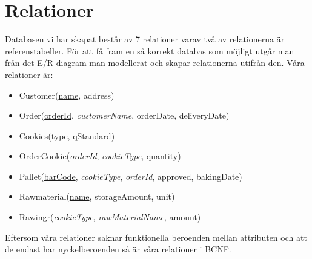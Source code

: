 \section{Relationer}

Databasen vi har skapat består av 7 relationer varav två av relationerna är referenstabeller. För att få fram en så korrekt databas som möjligt utgår man från det E/R diagram man modellerat och skapar relationerna utifrån den. Våra relationer är:

\begin{itemize}
	
\item{Customer(\underline{name}, address)}
\item{Order(\underline{orderId}, \emph{customerName}, orderDate, deliveryDate)}
\item{Cookies(\underline{type}, qStandard)}
\item{OrderCookie(\underline{\emph{orderId}}, \underline{\emph{cookieType}}, quantity)}
\item{Pallet(\underline{barCode}, \emph{cookieType}, \emph{orderId}, approved, bakingDate)}
\item{Rawmaterial(\underline{name}, storageAmount, unit)}
\item{Rawingr(\underline{\emph{cookieType}}, \underline{\emph{rawMaterialName}}, amount)}

\end{itemize}

Eftersom våra relationer saknar funktionella beroenden mellan attributen och att de endast har nyckelberoenden så är våra relationer i BCNF. 
